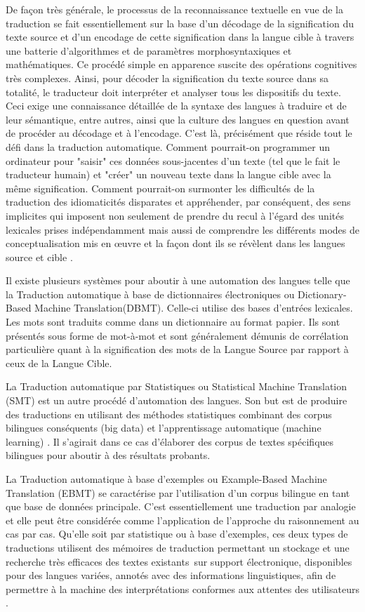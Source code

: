 \documentclass[french]{textolivre}
\begin{document}
De façon très générale, le processus de la reconnaissance textuelle en vue de la traduction se fait essentiellement sur la base d’un décodage de la signification du texte source et d’un encodage de cette signification dans la langue cible à travers une batterie d’algorithmes et de paramètres morphosyntaxiques et mathématiques. Ce procédé simple en apparence suscite des opérations cognitives très complexes. Ainsi, pour décoder la signification du texte source dans sa totalité, le traducteur doit interpréter et analyser tous les dispositifs du texte. Ceci exige une connaissance détaillée de la syntaxe des langues à traduire et de leur sémantique, entre autres, ainsi que la culture des langues en question avant de procéder au décodage et à l’encodage. C’est là, précisément que réside tout le défi dans la traduction automatique. Comment pourrait-on programmer un ordinateur pour "saisir" ces données sous-jacentes d’un texte (tel que le fait le traducteur humain) et "créer" un nouveau texte dans la langue cible avec la même signification. Comment pourrait-on surmonter les difficultés de la traduction des idiomaticités disparates et appréhender, par conséquent, des sens implicites qui imposent non seulement de prendre du recul à l’égard des unités lexicales prises indépendamment mais aussi de comprendre les différents modes de conceptualisation mis en œuvre et la façon dont ils se révèlent dans les langues source et cible \cite{vandaele2005}.

Il existe plusieurs systèmes pour aboutir à une automation des langues telle que la Traduction automatique à base de dictionnaires électroniques ou Dictionary-Based Machine Translation(DBMT). Celle-ci utilise des bases d’entrées lexicales. Les mots sont traduits comme dans un dictionnaire au format papier. Ils sont présentés sous forme de mot-à-mot et sont généralement démunis de corrélation particulière quant à la signification des mots de la Langue Source par rapport à ceux de la Langue Cible.

La Traduction automatique par Statistiques ou Statistical Machine Translation (SMT) est un autre procédé d’automation des langues. Son but est de produire des traductions en utilisant des méthodes statistiques combinant des corpus bilingues conséquents (big data) et l'apprentissage automatique (machine learning) \cite[p. 2]{zemni2021}. Il s’agirait dans ce cas d’élaborer des corpus de textes spécifiques bilingues pour aboutir à des résultats probants.

La Traduction automatique à base d’exemples ou Example-Based Machine Translation (EBMT) se caractérise par l’utilisation d'un corpus bilingue en tant que base de données principale. C'est essentiellement une traduction par analogie et elle peut être considérée comme l’application de l’approche du raisonnement au cas par cas. Qu’elle soit par statistique ou à base d’exemples, ces deux types de traductions utilisent des mémoires de traduction permettant un stockage et une recherche très efficaces des textes existants sur support électronique, disponibles pour des langues variées, annotés avec des informations linguistiques, afin de permettre à la machine des interprétations conformes aux attentes des utilisateurs \cite{ke_hu2020}.
\end{document}
